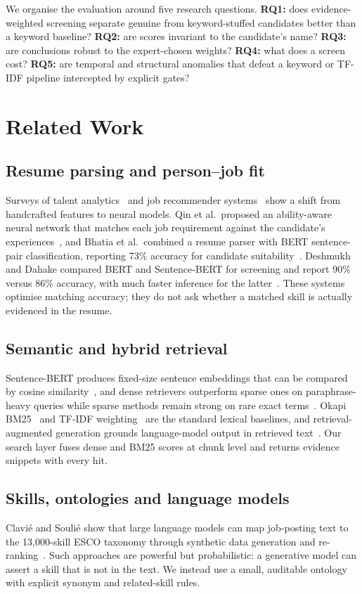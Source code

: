 \documentclass[conference]{IEEEtran}
\begin{document}
We organise the evaluation around five research questions. \textbf{RQ1:} does evidence-weighted screening separate genuine from keyword-stuffed candidates better than a keyword baseline? \textbf{RQ2:} are scores invariant to the candidate's name? \textbf{RQ3:} are conclusions robust to the expert-chosen weights? \textbf{RQ4:} what does a screen cost? \textbf{RQ5:} are temporal and structural anomalies that defeat a keyword or TF-IDF pipeline intercepted by explicit gates?

\section{Related Work}
\subsection{Resume parsing and person--job fit}
Surveys of talent analytics~\cite{qin_survey} and job recommender systems~\cite{ruijt} show a shift from handcrafted features to neural models. Qin et al.\ proposed an ability-aware neural network that matches each job requirement against the candidate's experiences~\cite{qin_pjf}, and Bhatia et al.\ combined a resume parser with BERT sentence-pair classification, reporting 73\% accuracy for candidate suitability~\cite{bhatia}. Deshmukh and Dahake compared BERT and Sentence-BERT for screening and report 90\% versus 86\% accuracy, with much faster inference for the latter~\cite{deshmukh}. These systems optimise matching accuracy; they do not ask whether a matched skill is actually evidenced in the resume.

\subsection{Semantic and hybrid retrieval}
Sentence-BERT produces fixed-size sentence embeddings that can be compared by cosine similarity~\cite{sbert}, and dense retrievers outperform sparse ones on paraphrase-heavy queries while sparse methods remain strong on rare exact terms~\cite{dpr}. Okapi BM25~\cite{bm25} and TF-IDF weighting~\cite{tfidf} are the standard lexical baselines, and retrieval-augmented generation grounds language-model output in retrieved text~\cite{rag}. Our search layer fuses dense and BM25 scores at chunk level and returns evidence snippets with every hit.

\subsection{Skills, ontologies and language models}
Clavi\'e and Souli\'e show that large language models can map job-posting text to the 13{,}000-skill ESCO taxonomy through synthetic data generation and re-ranking~\cite{clavie}. Such approaches are powerful but probabilistic: a generative model can assert a skill that is not in the text. We instead use a small, auditable ontology with explicit synonym and related-skill rules.
\end{document}
